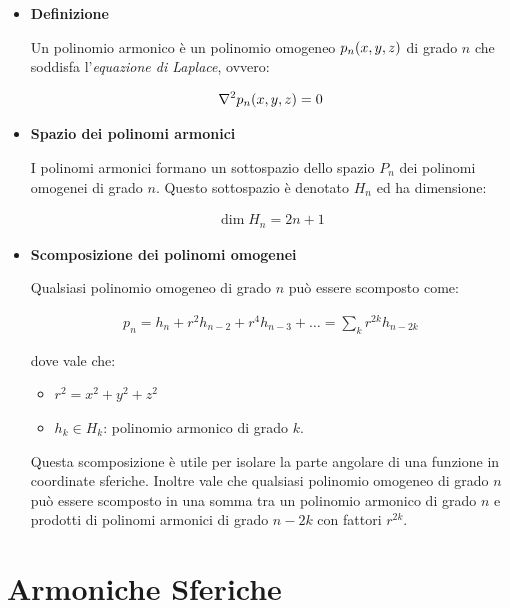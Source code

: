 \begin{myriass}

\begin{itemize}
	
	\item \textbf{Definizione}
	
		Un polinomio armonico è un polinomio omogeneo $p_n\qty(x, y, z)$ di grado $n$ che soddisfa l'\textit{equazione di Laplace}, ovvero:
	
	\begin{align*}
		\nabla^2 p_n\qty(x, y, z) = 0
	\end{align*}

	\item \textbf{Spazio dei polinomi armonici}
	
		I polinomi armonici formano un sottospazio dello spazio $P_n$ dei polinomi omogenei di grado $n$. Questo sottospazio è denotato $H_n$ ed ha dimensione:
		
	\begin{align*}
		\dim H_n = 2n + 1
	\end{align*}
	

	\item \textbf{Scomposizione dei polinomi omogenei}
	
		Qualsiasi polinomio omogeneo di grado $n$ può essere scomposto come:
		
	\begin{align*}
		p_n = h_n + r^2 h_{n-2} + r^4 h_{n-3} + \ldots = \sum_k r^{2k} h_{n-2k}
	\end{align*}
	
		dove vale che:
	
	\begin{itemize}
		\item $r^2 = x^2 + y^2 + z^2$
		\item $h_k \in H_k$: polinomio armonico di grado $k$.
	\end{itemize}
	
		Questa scomposizione è utile per isolare la parte angolare di una funzione in coordinate sferiche. Inoltre vale che qualsiasi polinomio omogeneo di grado $n$ può essere scomposto in una somma tra un polinomio armonico di grado $n$ e prodotti di polinomi armonici di grado $n - 2k$ con fattori $r^{2k}$.
		
\end{itemize}
\end{myriass}

\section{Armoniche Sferiche}

